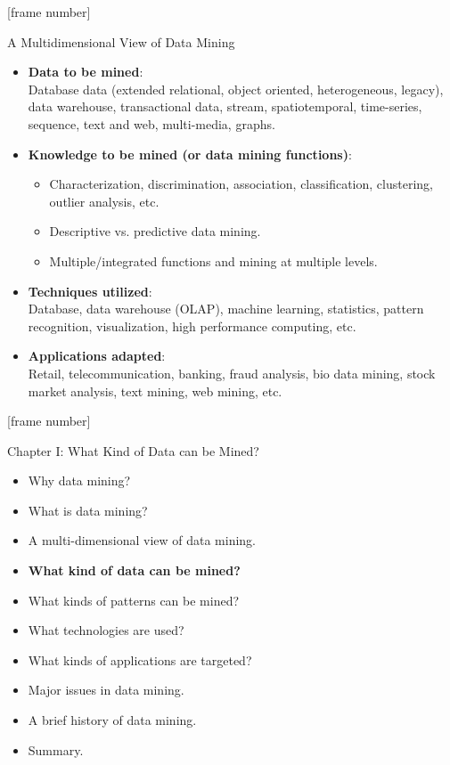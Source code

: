 \documentclass[aspectratio=169,t]{beamer}
\begin{document}
  {
    [frame number]
    \begin{frame}{A Multidimensional View of Data Mining}
        \begin{itemize}
            \item \textbf{Data to be mined}:\\
                  \small{Database data (extended relational, object oriented, heterogeneous, legacy), data warehouse, transactional data, stream, spatiotemporal, time-series, sequence, text and web, multi-media, graphs.}
            \item \textbf{Knowledge to be mined (or data mining functions)}:\\
                  \begin{itemize}
                      \item Characterization, discrimination, association, classification, clustering, outlier analysis, etc.
                      \item Descriptive vs. predictive data mining.
                      \item Multiple/integrated functions and mining at multiple levels.
                  \end{itemize}
            \item \textbf{Techniques utilized}:\\
                  \small{Database, data warehouse (OLAP), machine learning, statistics, pattern recognition, visualization, high performance computing, etc.}
            \item \textbf{Applications adapted}:\\
                  \small{Retail, telecommunication, banking, fraud analysis, bio data mining, stock market analysis, text mining, web mining, etc.}
        \end{itemize}
    \end{frame}
  }

  {
    [frame number]
    \begin{frame}{Chapter I: What Kind of Data can be Mined?}
        \begin{itemize}
            \item Why data mining?
            \item What is data mining?
            \item A multi-dimensional view of data mining.
            \item \textbf{What kind of data can be mined?}
            \item What kinds of patterns can be mined?
            \item What technologies are used?
            \item What kinds of applications are targeted?
            \item Major issues in data mining.
            \item A brief history of data mining.
            \item Summary.
        \end{itemize}
    \end{frame}
  }
\end{document}
